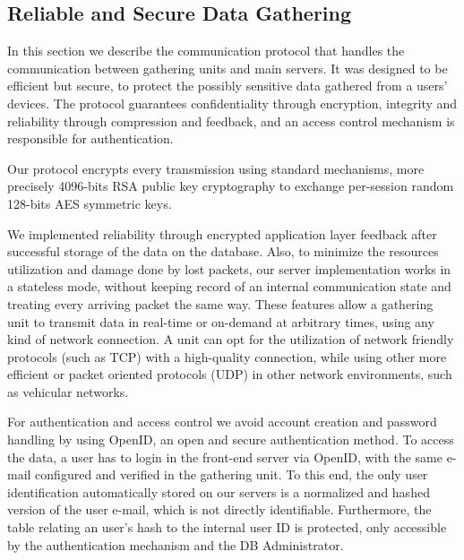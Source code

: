 \subsection{Reliable and Secure Data Gathering}
\label{sec:secure}

In this section we describe the communication protocol that handles the communication between gathering units and main servers.
It was designed to be efficient but secure, to protect the possibly sensitive data gathered from a users' devices.
The protocol guarantees confidentiality through encryption, integrity and reliability through compression and feedback, and an access control mechanism is responsible for authentication.

Our protocol encrypts every transmission using standard mechanisms, more precisely 4096-bits RSA public key cryptography to exchange per-session random 128-bits AES symmetric keys.



We implemented reliability through encrypted application layer feedback after successful storage of the data on the database.
Also, to minimize the resources utilization and damage done by lost packets, our server implementation works in a stateless mode, without keeping record of an internal communication state and treating every arriving packet the same way.
These features allow a gathering unit to transmit data in real-time or on-demand at arbitrary times, using any kind of network connection.
A unit can opt for the utilization of network friendly protocols (such as TCP) with a high-quality connection, while using other more efficient or packet oriented protocols (UDP) in other network environments, such as vehicular networks.


For authentication and access control we avoid account creation and password handling by using OpenID, an open and secure authentication method.
To access the data, a user has to login in the front-end server via OpenID, with the same e-mail configured and verified in the gathering unit.
To this end, the only user identification automatically stored on our servers is a normalized and hashed version of the user e-mail, which is not directly identifiable.
Furthermore, the table relating an user's hash to the internal user ID is protected, only accessible by the authentication mechanism and the DB Administrator.



